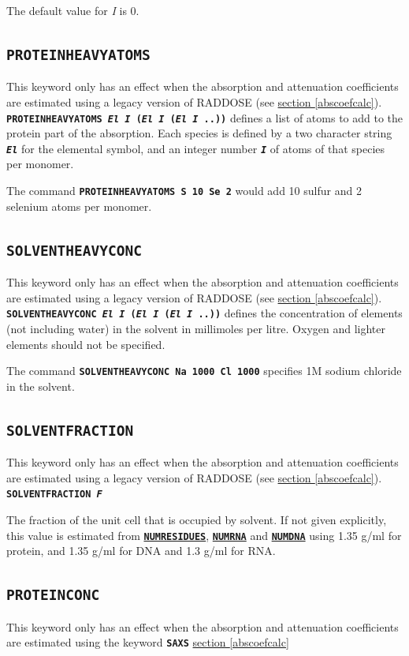\documentclass[a4paper]{article}
\newcommand{\Keyword}[1]{\texttt{\textbf{#1}}\xspace}
\newcommand{\SB}{\\[0.2em]}
\newcommand{\RDLegacyKeyword}{This keyword only has an effect when the absorption and attenuation coefficients are estimated using a legacy version of RADDOSE (see \hyperref[abscoefcalc]{section \ref*{abscoefcalc}}).\SB
}
\begin{document}
The default value for \textit{I} is 0.


\subsection{\Keyword{PROTEINHEAVYATOMS}}
\label{proteinheavyatoms}
\RDLegacyKeyword

\noindent \Keyword{PROTEINHEAVYATOMS \textit{El I} (\textit{El I} (\textit{El I} ..))}
defines a list of atoms to add to the protein part of the absorption. Each species is defined by a two character string \Keyword{\textit{El}} for the elemental symbol, and an integer number \Keyword{\textit{I}} of atoms of that species per monomer.

The command \Keyword{PROTEINHEAVYATOMS S 10 Se 2} would add 10 sulfur and 2 selenium atoms per monomer.


\subsection{\Keyword{SOLVENTHEAVYCONC}}
\label{solventheavyconc}
\RDLegacyKeyword

\noindent \Keyword{SOLVENTHEAVYCONC \textit{El I} (\textit{El I} (\textit{El I} ..))}
defines the concentration of elements (not including water) in the solvent in millimoles per litre. Oxygen and lighter elements should not be specified.

The command \Keyword{SOLVENTHEAVYCONC Na 1000 Cl 1000} specifies 1M sodium chloride in the solvent.


\subsection{\Keyword{SOLVENTFRACTION}}
\label{solventfraction}
\RDLegacyKeyword

\noindent \Keyword{SOLVENTFRACTION \textit{F}}

The fraction of the unit cell that is occupied by solvent. If not given explicitly, this value is estimated from \hyperref[numresidues]{\Keyword{NUMRESIDUES}}, \hyperref[numrna]{\Keyword{NUMRNA}} and \hyperref[numdna]{\Keyword{NUMDNA}} using 1.35 g/ml for protein, and 1.35 g/ml for DNA and 1.3 g/ml for RNA.


\subsection{\Keyword{PROTEINCONC}}
\label{proteinconc}
This keyword only has an effect when the absorption and attenuation coefficients are estimated using the keyword \Keyword{SAXS} \hyperref[abscoefcalc]{section \ref*{abscoefcalc}\SB}
\end{document}
